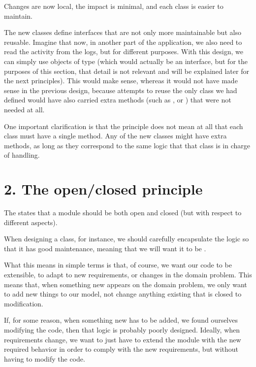\documentclass[a4paper,10pt,english]{sphinxmanual}
\begin{document}
Changes are now local, the impact is minimal, and each class is easier to maintain.

The new classes define interfaces that are not only more maintainable but also reusable.
Imagine that now, in another part of the application, we also need to read the activity from
the logs, but for different purposes. With this design, we can simply use objects of type
 (which would actually be an interface, but for the purposes of this
section, that detail is not relevant and will be explained later for the next principles). This
would make sense, whereas it would not have made sense in the previous design, because
attempts to reuse the only class we had defined would have also carried extra methods
(such as , or ) that were not needed at all.

One important clarification is that the principle does not mean at all that each class must
have a single method. Any of the new classes might have extra methods, as long as they
correspond to the same logic that that class is in charge of handling.


\section{2. The open/closed principle}
\label{\detokenize{chapters/4_solid_principles/index:the-open-closed-principle}}
The  states that a module should be both open and closed (but
with respect to different aspects).

When designing a class, for instance, we should carefully encapsulate the logic so that it has
good maintenance, meaning that we will want it to be .

What this means in simple terms is that, of course, we want our code to be extensible, to
adapt to new requirements, or changes in the domain problem. This means that, when
something new appears on the domain problem, we only want to add new things to our
model, not change anything existing that is closed to modification.

If, for some reason, when something new has to be added, we found ourselves modifying
the code, then that logic is probably poorly designed. Ideally, when requirements change,
we want to just have to extend the module with the new required behavior in order to
comply with the new requirements, but without having to modify the code.
\end{document}
